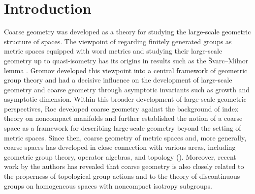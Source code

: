 \documentclass[12pt, a4paper]{amsart}
\theoremstyle{definition}
\begin{document}
\begin{abstract}
In this paper, we provide a categorical framework for understanding coarse
subspaces of coarse spaces.
First, we introduce the notion of a controlled total relation between coarse
spaces and show that the category whose morphisms are closeness classes of
controlled total relations is isomorphic to the conventional category of
coarse spaces defined using closeness classes of controlled maps.
Next, we show that the assignment associating to each coarse space the
finite-join partially ordered set of its coarse subspaces is functorial, and
prove that this partially ordered set is naturally isomorphic to the poset of
subobjects in the category of coarse spaces.
Furthermore, we formulate asymptotic disjointness between coarse subspaces
and show that mono-morphisms preserve this relation.
These results provide a categorical interpretation of the framework of
coarse subspaces introduced by 
Leitner--Vigolo [Lecture Notes in Math.~(2023)] 
and characterize coarse subspaces as objects
intrinsic to the category of coarse spaces.
They also provide a foundation for a coarse-geometric interpretation of the
properness criterion established by Kobayashi
[Math.~Ann.~(1989); J.~Lie Theory (1996)]
and Benoist
[Ann.~of Math.~(1996)]
(cf.~Nagaya--Ogawa--Okuda
[Proc.~Japan Acad.~Ser.~A (2025)]).
\end{abstract}

\section{Introduction}

Coarse geometry was developed as a theory for studying the large-scale geometric structure of spaces.
The viewpoint of regarding finitely generated groups as metric spaces equipped with word metrics and studying their large-scale geometry up to quasi-isometry has its origins in results such as the Švarc--Milnor lemma
\cite{Milnor1968Curvature, Svarc1955}.
Gromov \cite{Gromov1987,Gromov1993} developed this viewpoint into a central framework of geometric group theory and had a decisive influence on the development of large-scale geometry and coarse geometry through asymptotic invariants such as growth and asymptotic dimension.
Within this broader development of large-scale geometric perspectives,
Roe \cite{Roe1993,Roe1996IndexTheory,Roe2003LectureCoarse} developed
coarse geometry against the background of index theory on noncompact
manifolds and further established the notion of a coarse space as a
framework for describing large-scale geometry beyond the setting of
metric spaces.
Since then, coarse geometry of metric spaces and, more generally, coarse
spaces has developed in close connection with various areas, including
geometric group theory, operator algebras, and topology
(\cite{ArzhantsevaGuentnerSpakula2012, BellDranishnikov2008, HigsonRoe1995, HigsonRoeYu1993, Nowak2007, Nowak2015, NowakYu2023, Yu1998, Yu2000}).
Moreover, recent work by the authors
\cite{Nagaya2026,NagayaOgawaOkuda2025,OgawaOkuda2025Kob60} has revealed
that coarse geometry is also closely related to the properness of
topological group actions and to the theory of discontinuous groups on
homogeneous spaces with noncompact isotropy subgroups.
\end{document}

